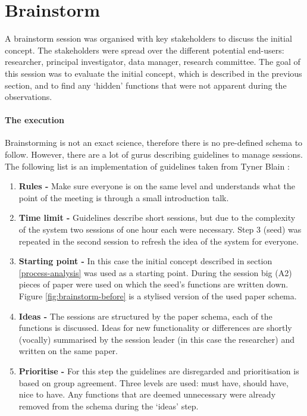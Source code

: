 \section{Brainstorm}
\label{brainstorm}

A brainstorm session was organised with key stakeholders to discuss the initial concept.
The stakeholders were spread over the different potential end-users: researcher, principal investigator, data manager, research committee.
The goal of this session was to evaluate the initial concept, which is described in the previous section, and to find any `hidden' functions that were not apparent during the observations.

\paragraph{The execution}
Brainstorming is not an exact science, therefore there is no pre-defined schema to follow.
However, there are a lot of gurus describing guidelines to manage sessions.
The following list is an implementation of guidelines taken from Tyner Blain \cite{brainstormWebsite}:

\begin{enumerate}
	\item \textbf{Rules -} Make sure everyone is on the same level and understands what the point of the meeting is through a small introduction talk.
	\item \textbf{Time limit -} Guidelines describe short sessions, but due to the complexity of the system two sessions of one hour each were necessary.
		Step 3 (seed) was repeated in the second session to refresh the idea of the system for everyone.
	\item \textbf{Starting point -} In this case the initial concept described in section \ref{process-analysis} was used as a starting point.
		During the session big (A2) pieces of paper were used on which the seed's functions are written down. Figure \ref{fig:brainstorm-before} is a stylised version of the used paper schema.
	\item \textbf{Ideas -} The sessions are structured by the paper schema, each of the functions is discussed.
		Ideas for new functionality or differences are shortly (vocally) summarised by the session leader (in this case the researcher) and written on the same paper.
	\item \textbf{Prioritise -} For this step the guidelines are disregarded and prioritisation is based on group agreement.
		Three levels are used: must have, should have, nice to have.
		Any functions that are deemed unnecessary were already removed from the schema during the `ideas' step.
\end{enumerate}

